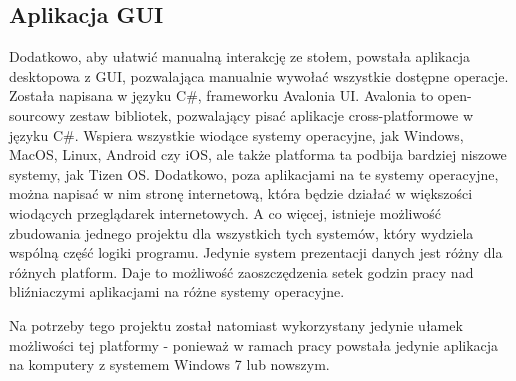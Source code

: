 






\subsection{Aplikacja GUI}
\label{cha:gui_app}
Dodatkowo, aby ułatwić manualną interakcję ze stołem, powstała aplikacja desktopowa z GUI, pozwalająca manualnie wywołać wszystkie dostępne operacje. Została napisana w języku C\#, frameworku Avalonia UI. Avalonia to open-sourcowy zestaw bibliotek, pozwalający pisać aplikacje cross-platformowe w języku C\#. Wspiera wszystkie wiodące systemy operacyjne, jak Windows, MacOS, Linux, Android czy iOS, ale także platforma ta podbija bardziej niszowe systemy, jak Tizen OS. Dodatkowo, poza aplikacjami na te systemy operacyjne, można napisać w nim stronę internetową, która będzie działać w większości wiodących przeglądarek internetowych. A co więcej, istnieje możliwość zbudowania jednego projektu dla wszystkich tych systemów, który wydziela wspólną część logiki programu. Jedynie system prezentacji danych jest różny dla różnych platform. Daje to możliwość zaoszczędzenia setek godzin pracy nad bliźniaczymi aplikacjami na różne systemy operacyjne. \cite{avalonia}

Na potrzeby tego projektu został natomiast wykorzystany jedynie ułamek możliwości tej platformy - ponieważ w ramach pracy powstała jedynie aplikacja na komputery z systemem Windows 7 lub nowszym.

